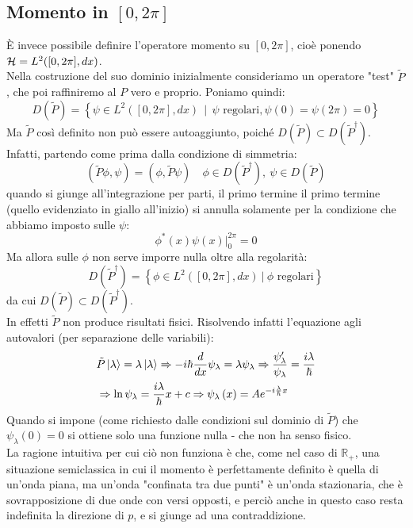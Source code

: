 \documentclass[../../FisicaTeorica.tex]{subfiles}
\begin{document}
\subsection{Momento in $[0,2\pi]$}
È invece possibile definire l'operatore momento su $[0,2\pi]$, cioè ponendo $\mathcal{H} = L^2([0,2\pi],dx)$.\\
Nella costruzione del suo dominio inizialmente consideriamo un operatore "test" $\tilde{P}$, che poi raffiniremo al $P$ vero e proprio. Poniamo quindi:
\[
D\left(\widetilde{P}\right)= \left\{\psi\in L^2\left(\left[0,2\pi\right],dx\right)\ \ |\ \ \psi\text{ regolari},\psi\left(0\right)=\psi\left(2\pi\right)=0\right\}
\]
Ma $\widetilde{P}$ così definito non può essere autoaggiunto, poiché $D(\widetilde{P})\subset D({\widetilde{P}}^\dag)$. Infatti, partendo come prima dalla condizione di simmetria:
\[
\left(\widetilde{P}\phi,\psi\right)=\left(\phi,\widetilde{P}\psi\right)\quad \phi\in D(\tilde{P}^\dag), \> \psi \in D(\tilde{P})
\]
quando si giunge all'integrazione per parti, il primo termine il primo termine (quello evidenziato in giallo all'inizio) si annulla solamente per la condizione che abbiamo imposto sulle $\psi$:
\[
\phi^\ast\left(x\right)\psi\left(x\right)\big|_0^{2\pi}=0
\]
Ma allora sulle $\phi$ non serve imporre nulla oltre alla regolarità:
\[
D\left({\widetilde{P}}^\dag\right)=\left\{\phi\in L^2\left(\left[0,2\pi\right],dx\right)\ |\ \phi\text{ regolari}\right\}
\]
da cui $D(\tilde{P})\subset D(\tilde{P}^\dag)$.\\
In effetti $\tilde{P}$ non produce risultati fisici. Risolvendo infatti l'equazione agli autovalori (per separazione delle variabili):
\begin{align*}
    &\tilde{P}\ket{\lambda} = \lambda \ket{\lambda} \Rightarrow -i\hbar\frac{d}{dx}\psi_\lambda = \lambda\psi_\lambda \Rightarrow \frac{\psi_\lambda'}{\psi_\lambda} = \frac{i\lambda}{\hbar}\\
    &\Rightarrow \ln \psi_\lambda = \frac{i\lambda}{\hbar}x + c \Rightarrow \psi_\lambda\left(x\right)=A e^{-i\frac{\lambda}{\hbar}x}
\end{align*}
Quando si impone (come richiesto dalle condizioni sul dominio di $\tilde{P}$) che $\psi_\lambda\left(0\right)=0$ si ottiene solo una funzione nulla - che non ha senso fisico.\\
La ragione intuitiva per cui ciò non funziona è che, come nel caso di $\mathbb{R}_+$, una situazione semiclassica in cui il momento è perfettamente definito è quella di un'onda piana, ma un'onda "confinata tra due punti" è un'onda stazionaria, che è sovrapposizione di due onde con versi opposti, e perciò anche in questo caso resta indefinita la direzione di $p$, e si giunge ad una contraddizione.\\
\end{document}
